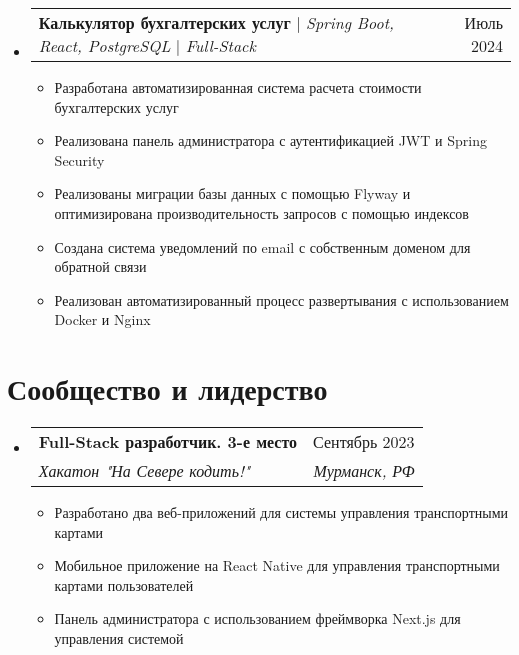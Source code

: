 \documentclass[letterpaper,11pt]{article}
\makeatletter
\newcommand{\resumeItem}[1]{
  \item\small{
    {#1 \vspace{-2pt}}
  }
}
\newcommand{\resumeSubheading}[4]{
  \vspace{-2pt}\item
    \begin{tabular*}{0.97\textwidth}[t]{l@{\extracolsep{\fill}}r}
      \textbf{#1} & #2 \\
      \textit{\small#3} & \textit{\small #4} \\
    \end{tabular*}\vspace{-7pt}
}
\newcommand{\resumeProjectHeading}[2]{
    \item
    \begin{tabular*}{0.97\textwidth}{l@{\extracolsep{\fill}}r}
      \small#1 & #2 \\
    \end{tabular*}\vspace{-7pt}
}
\newcommand{\resumeSubHeadingListStart}{\begin{itemize}[leftmargin=0.15in, label={}]}
\newcommand{\resumeSubHeadingListEnd}{\end{itemize}}
\newcommand{\resumeItemListStart}{\begin{itemize}}
\newcommand{\resumeItemListEnd}{\end{itemize}\vspace{-5pt}}
\makeatother
\begin{document}
\resumeSubHeadingListStart

  \resumeProjectHeading
      {\textbf{Калькулятор бухгалтерских услуг} $|$ \emph{Spring Boot, React, PostgreSQL} $|$ \emph{Full-Stack}}{Июль 2024}
      \resumeItemListStart
        \resumeItem{Разработана автоматизированная система расчета стоимости бухгалтерских услуг}
        \resumeItem{Реализована панель администратора с аутентификацией JWT и Spring Security}
        \resumeItem{Реализованы миграции базы данных с помощью Flyway и оптимизирована производительность запросов с помощью индексов}
        \resumeItem{Создана система уведомлений по email с собственным доменом для обратной связи}
        \resumeItem{Реализован автоматизированный процесс развертывания с использованием Docker и Nginx}

    \resumeItemListEnd

\resumeSubHeadingListEnd

\section{Сообщество и лидерство}
  \resumeSubHeadingListStart
    \resumeSubheading
      {Full-Stack разработчик. 3-е место}{Сентябрь 2023}
      {Хакатон "На Севере кодить!"}{Мурманск, РФ}
      \resumeItemListStart
        \resumeItem{Разработано два веб-приложений для системы управления транспортными картами}
        \resumeItem{Мобильное приложение на React Native для управления транспортными картами пользователей}
        \resumeItem{Панель администратора с использованием фреймворка Next.js для управления системой}
      \resumeItemListEnd
    \resumeSubHeadingListEnd
\end{document}
